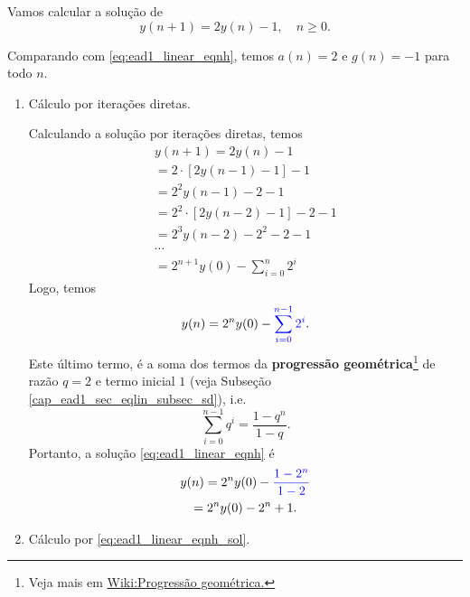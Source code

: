 \begin{ex}
  Vamos calcular a solução de
  \begin{equation}\label{eq:ex_ead1_lin_enh}
    y(n+1) = 2y(n) - 1,\quad n\geq 0.
  \end{equation}

  Comparando com \eqref{eq:ead1_linear_eqnh}, temos $a(n) = 2$ e $g(n)=-1$ para todo $n$.

  \begin{enumerate}
  \item Cálculo por iterações diretas.

    Calculando a solução por iterações diretas, temos
    \begin{gather}
      y(n+1) = 2y(n)-1 \\
      = 2\cdot \left[2y(n-1)-1\right]-1 \\
      = 2^2y(n-1)-2-1 \\
      = 2^2\cdot \left[2y(n-2)-1\right]-2-1 \\
      = 2^3y(n-2)-2^2-2-1 \\
      \cdots \nonumber\\
      = 2^{n+1}y(0)-\sum_{i=0}^{n}2^i
    \end{gather}
    Logo, temos
    \begin{equation}
      y(n) = 2^ny(0) - {\color{blue}\sum_{i=0}^{n-1} 2^i}.
    \end{equation}
    Este último termo, é a soma dos termos da {\bf progressão geométrica}\footnote{Veja mais em \href{https://pt.wikipedia.org/wiki/Progress\%C3\%A3o\_geom\%C3\%A9trica}{Wiki:Progressão geométrica.}} de razão $q=2$ e termo inicial $1$ (veja Subseção \ref{cap_ead1_sec_eqlin_subsec_sd}), i.e.
  \begin{equation}
    \sum_{i=0}^{n-1} q^i = \frac{1-q^n}{1-q}.
  \end{equation}
  Portanto, a solução \eqref{eq:ead1_linear_eqnh} é
  \begin{gather}
    y(n) = 2^ny(0) - {\color{blue}\frac{1-2^{n}}{1-2}} \\
    = 2^{n}y(0) -2^{n}+1.
  \end{gather}

\item Cálculo por \eqref{eq:ead1_linear_eqnh_sol}.
  

\end{enumerate}
\end{ex}
